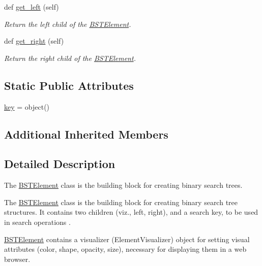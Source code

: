 \begin{DoxyCompactItemize}
def \mbox{\hyperlink{classbridges_1_1bst__element_1_1_b_s_t_element_a3f5220af41a00cc6d24d0c592caabbb0}{get\+\_\+left}} (self)
\begin{DoxyCompactList}\small\item\em Return the left child of the \mbox{\hyperlink{classbridges_1_1bst__element_1_1_b_s_t_element}{B\+S\+T\+Element}}. \end{DoxyCompactList}\item 
def \mbox{\hyperlink{classbridges_1_1bst__element_1_1_b_s_t_element_a63873a4e910831c2581658847d14836c}{get\+\_\+right}} (self)
\begin{DoxyCompactList}\small\item\em Return the right child of the \mbox{\hyperlink{classbridges_1_1bst__element_1_1_b_s_t_element}{B\+S\+T\+Element}}. \end{DoxyCompactList}\end{DoxyCompactItemize}
\subsection*{Static Public Attributes}
\begin{DoxyCompactItemize}
\item 
\mbox{\hyperlink{classbridges_1_1bst__element_1_1_b_s_t_element_a8b4c0d8d6a2a7e0fefb013038d26f146}{key}} = object()
\end{DoxyCompactItemize}
\subsection*{Additional Inherited Members}


\subsection{Detailed Description}
The \mbox{\hyperlink{classbridges_1_1bst__element_1_1_b_s_t_element}{B\+S\+T\+Element}} class is the building block for creating binary search trees. 

The \mbox{\hyperlink{classbridges_1_1bst__element_1_1_b_s_t_element}{B\+S\+T\+Element}} class is the building block for creating binary search tree structures. It contains two children (viz., left, right), and a search key, to be used in search operations .

\mbox{\hyperlink{classbridges_1_1bst__element_1_1_b_s_t_element}{B\+S\+T\+Element}} contains a visualizer (Element\+Visualizer) object for setting visual attributes (color, shape, opacity, size), necessary for displaying them in a web browser.

